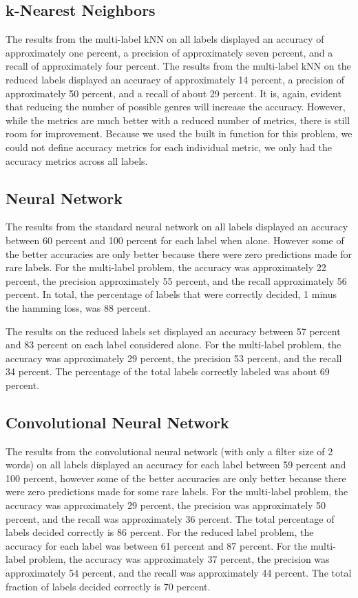 \documentclass[sigconf]{acmart}
\begin{document}
\subsection{k-Nearest Neighbors}
The results from the multi-label kNN on all labels displayed an accuracy of approximately one percent, a precision of approximately seven percent, and a recall of approximately four percent. The results from the multi-label kNN on the reduced labels displayed an accuracy of approximately 14 percent, a precision of approximately 50 percent, and a recall of about 29 percent. It is, again, evident that reducing the number of possible genres will increase the accuracy. However, while the metrics are much better with a reduced number of metrics, there is still room for improvement. Because we used the built in function for this problem, we could not define accuracy metrics for each individual metric, we only had the accuracy metrics across all labels.

\subsection{Neural Network}
The results from the standard neural network on all labels displayed an accuracy between 60 percent and 100 percent for each label when alone. However some of the better accuracies are only better because there were zero predictions made for rare labels. For the multi-label problem, the accuracy was approximately 22 percent, the precision approximately 55 percent, and the recall approximately 56 percent. In total, the percentage of labels that were correctly decided, 1 minus the hamming loss, was 88 percent.

The results on the reduced labels set displayed an accuracy between 57 percent and 83 percent on each label considered alone. For the multi-label problem, the accuracy was approximately 29 percent, the precision 53 percent, and the recall 34 percent. The percentage of the total labels correctly labeled was about 69 percent.

\subsection{Convolutional Neural Network}
The results from the convolutional neural network (with only a filter size of 2 words) on all labels displayed an accuracy for each label between 59 percent and 100 percent, however some of the better accuracies are only better because there were zero predictions made for some rare labels. For the multi-label problem, the accuracy was approximately 29 percent, the precision was approximately 50 percent, and the recall was approximately 36 percent. The total percentage of labels decided correctly is 86 percent. For the reduced label problem, the accuracy for each label was between 61 percent and 87 percent. For the multi-label problem, the accuracy was approximately 37 percent, the precision was approximately 54 percent, and the recall was approximately 44 percent. The total fraction of labels decided correctly is 70 percent.
\end{document}
